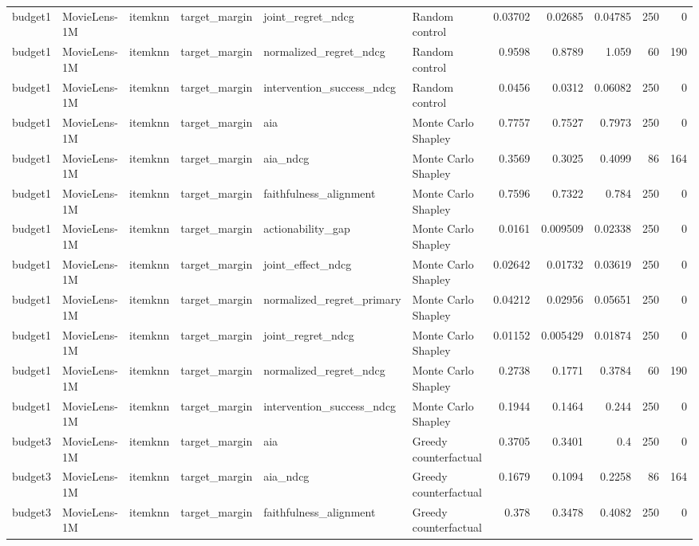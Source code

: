 \begin{table}[t]
{\begin{tabular}{llllllrrrrr}
budget1 & MovieLens-1M & itemknn & target\_margin & joint\_regret\_ndcg & Random control & 0.03702 & 0.02685 & 0.04785 & 250 & 0 \\
budget1 & MovieLens-1M & itemknn & target\_margin & normalized\_regret\_ndcg & Random control & 0.9598 & 0.8789 & 1.059 & 60 & 190 \\
budget1 & MovieLens-1M & itemknn & target\_margin & intervention\_success\_ndcg & Random control & 0.0456 & 0.0312 & 0.06082 & 250 & 0 \\
budget1 & MovieLens-1M & itemknn & target\_margin & aia & Monte Carlo Shapley & 0.7757 & 0.7527 & 0.7973 & 250 & 0 \\
budget1 & MovieLens-1M & itemknn & target\_margin & aia\_ndcg & Monte Carlo Shapley & 0.3569 & 0.3025 & 0.4099 & 86 & 164 \\
budget1 & MovieLens-1M & itemknn & target\_margin & faithfulness\_alignment & Monte Carlo Shapley & 0.7596 & 0.7322 & 0.784 & 250 & 0 \\
budget1 & MovieLens-1M & itemknn & target\_margin & actionability\_gap & Monte Carlo Shapley & 0.0161 & 0.009509 & 0.02338 & 250 & 0 \\
budget1 & MovieLens-1M & itemknn & target\_margin & joint\_effect\_ndcg & Monte Carlo Shapley & 0.02642 & 0.01732 & 0.03619 & 250 & 0 \\
budget1 & MovieLens-1M & itemknn & target\_margin & normalized\_regret\_primary & Monte Carlo Shapley & 0.04212 & 0.02956 & 0.05651 & 250 & 0 \\
budget1 & MovieLens-1M & itemknn & target\_margin & joint\_regret\_ndcg & Monte Carlo Shapley & 0.01152 & 0.005429 & 0.01874 & 250 & 0 \\
budget1 & MovieLens-1M & itemknn & target\_margin & normalized\_regret\_ndcg & Monte Carlo Shapley & 0.2738 & 0.1771 & 0.3784 & 60 & 190 \\
budget1 & MovieLens-1M & itemknn & target\_margin & intervention\_success\_ndcg & Monte Carlo Shapley & 0.1944 & 0.1464 & 0.244 & 250 & 0 \\
budget3 & MovieLens-1M & itemknn & target\_margin & aia & Greedy counterfactual & 0.3705 & 0.3401 & 0.4 & 250 & 0 \\
budget3 & MovieLens-1M & itemknn & target\_margin & aia\_ndcg & Greedy counterfactual & 0.1679 & 0.1094 & 0.2258 & 86 & 164 \\
budget3 & MovieLens-1M & itemknn & target\_margin & faithfulness\_alignment & Greedy counterfactual & 0.378 & 0.3478 & 0.4082 & 250 & 0 \\

\end{tabular}}
\end{table}
